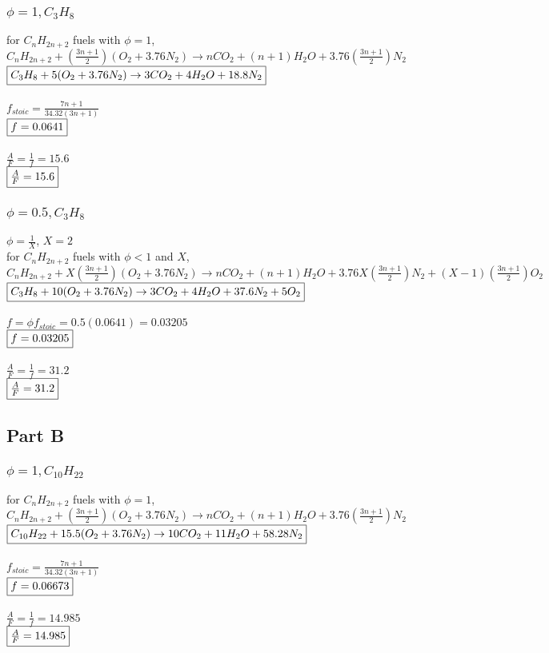\documentclass{article}
\begin{document}
\subsubsection*{$\phi=1, C_3H_8$}
for $C_nH_{2n+2}$ fuels with $\phi=1$, \\
$C_nH_{2n+2}+(\frac{3n+1}{2})(O_2+3.76N_2) \rightarrow nCO_2 + (n+1)H_2O +3.76(\frac{3n+1}{2})N_2$ \\
$\fbox{$C_3H_8+5(O_2+3.76N_2)\rightarrow 3CO_2+4H_2O+18.8N_2$}$ \\\\
$f_{stoic}=\frac{7n+1}{34.32(3n+1)}$ \\
$\fbox{$f=0.0641$}$ \\\\
$\frac{A}{F}=\frac{1}{f}=15.6$ \\
$\fbox{$\frac{A}{F}=15.6$}$

\subsubsection*{$\phi=0.5, C_3H_8$}
$\phi=\frac{1}{X}$, $X=2$ \\
for $C_nH_{2n+2}$ fuels with $\phi<1$ and $X$, \\
$C_nH_{2n+2}+X(\frac{3n+1}{2})(O_2+3.76N_2) \rightarrow nCO_2 + (n+1)H_2O +3.76X(\frac{3n+1}{2})N_2 +
(X-1)(\frac{3n+1}{2})O_2$ \\
$\fbox{$C_3H_8+10(O_2+3.76N_2)\rightarrow 3CO_2+4H_2O+37.6N_2+5O_2$}$ \\\\
$f=\phi f_{stoic}=0.5(0.0641)=0.03205$ \\
$\fbox{$f=0.03205$}$ \\\\
$\frac{A}{F}=\frac{1}{f}=31.2$ \\
$\fbox{$\frac{A}{F}=31.2$}$

\subsection*{Part B}
\subsubsection*{$\phi=1, C_{10}H_{22}$}
for $C_nH_{2n+2}$ fuels with $\phi=1$, \\
$C_nH_{2n+2}+(\frac{3n+1}{2})(O_2+3.76N_2) \rightarrow nCO_2 + (n+1)H_2O +3.76(\frac{3n+1}{2})N_2$ \\
$\fbox{$C_{10}H_{22}+15.5(O_2+3.76N_2) \rightarrow 10CO_2+11H_2O+58.28N_2$}$ \\\\
$f_{stoic}=\frac{7n+1}{34.32(3n+1)}$ \\
$\fbox{$f=0.06673$}$ \\\\
$\frac{A}{F}=\frac{1}{f}=14.985$ \\
$\fbox{$\frac{A}{F}=14.985$}$
\end{document}
